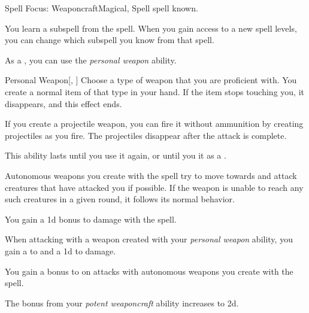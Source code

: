     \begin{feat}{Spell Focus: Weaponcraft}{Magical, Spell}
        \featpre {} spell known.

         You learn a subspell from the  spell.
        When you gain access to a new spell levels, you can change which subspell you know from that spell.

         As a , you can use the \textit{personal weapon} ability.
        \begin{ability}{Personal Weapon}[, ]
            Choose a type of weapon that you are proficient with.
            You create a normal item of that type in your hand.
            If the item stops touching you, it disappears, and this effect ends.

            If you create a projectile weapon, you can fire it without ammunition by creating projectiles as you fire.
            The projectiles disappear after the attack is complete.

            This ability lasts until you use it again, or until you  it as a .
        \end{ability}

         Autonomous weapons you create with the  spell try to move towards and attack creatures that have attacked you if possible.
        If the weapon is unable to reach any such creatures in a given round, it follows its normal behavior.

         You gain a \plus1d bonus to damage with the  spell. 

         When attacking with a weapon created with your \textit{personal weapon} ability, you gain a   to  and a \plus1d  to damage.

         You gain a  bonus to  on attacks with autonomous weapons you create with the  spell.

         The bonus from your \textit{potent weaponcraft} ability increases to \plus2d.
    \end{feat}


